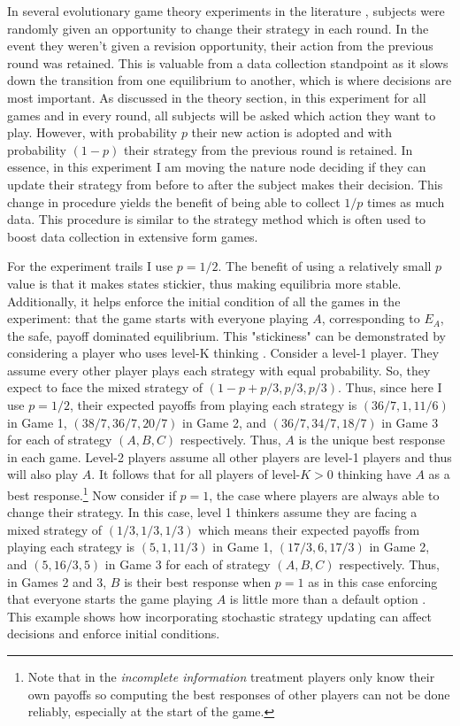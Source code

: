In several evolutionary game theory experiments in the literature \citep{hwang2018conventional, mas2016behavioral}, subjects were randomly given an opportunity to change their strategy in each round. 
In the event they weren't given a revision opportunity, their action from the previous round was retained. 
This is valuable from a data collection standpoint as it slows down the transition from one equilibrium to another, which is where decisions are most important. 
As discussed in the theory section, in this experiment for all games and in every round, all subjects will be asked which action they want to play. 
However, with probability $p$ their new action is adopted and with probability $(1-p)$ their strategy from the previous round is retained.
In essence, in this experiment I am moving the nature node deciding if they can update their strategy from before to after the subject makes their decision. 
This change in procedure yields the benefit of being able to collect $1/p$ times as much data. This procedure is similar to the strategy method \citep{selten1967strategiemethode} which is often used to boost data collection in extensive form games.

For the experiment trails I use $p = 1/2$. The benefit of using a relatively small $p$ value is that it makes states stickier, thus making equilibria more stable. Additionally, it helps enforce the initial condition of all the games in the experiment: that the game starts with everyone playing $A$, corresponding to $E_A$, the safe, payoff dominated equilibrium. This "stickiness" can be demonstrated by considering a player who uses level-K thinking \citep{Nagel1995, stahl1995players}. Consider a level-1 player. They assume every other player plays each strategy with equal probability. So, they expect to face the mixed strategy of $(1-p + p/3, p/3, p/3)$. Thus, since here I use $p = 1/2$, their expected payoffs from playing each strategy is $(36/7, 1, 11/6)$ in Game 1, $(38/7, 36/7, 20/7)$ in Game 2, and $(36/7, 34/7, 18/7)$ in Game 3 for each of strategy $(A, B, C)$ respectively. Thus, $A$ is the unique best response in each game. Level-2 players assume all other players are level-1 players and thus will also play $A$. It follows that for all players of level-$K > 0$ thinking have $A$ as a best response.\footnote{Note that in the \textit{incomplete information} treatment players only know their own payoffs so computing the best responses of other players can not be done reliably, especially at the start of the game.} Now consider if $p = 1$, the case where players are always able to change their strategy. In this case, level 1 thinkers assume they are facing a mixed strategy of $(1/3, 1/3, 1/3)$ which means their expected payoffs from playing each strategy is $(5, 1, 11/3)$ in Game 1, $(17/3, 6, 17/3)$ in Game 2, and $(5, 16/3, 5)$ in Game 3 for each of strategy $(A, B, C)$ respectively. Thus, in Games 2 and 3, $B$ is their best response when $p = 1$ as in this case enforcing that everyone starts the game playing $A$ is little more than a default option \citep{ThalerSunstein08, samuelson1988status}. This example shows how incorporating stochastic strategy updating can affect decisions and enforce initial conditions.  


